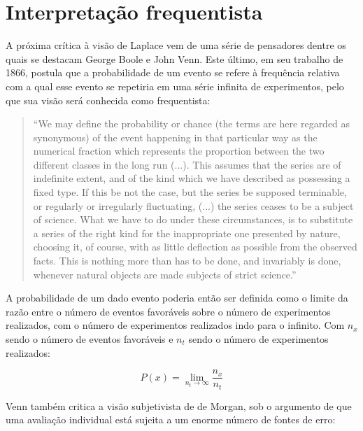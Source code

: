 \section{Interpretação frequentista}
A próxima crítica à visão de Laplace 
vem de uma série de pensadores dentre os quais se destacam George Boole e John Venn.
Este último, em seu trabalho de 
1866, postula que a probabilidade de um evento se refere à
frequência relativa com a qual esse evento se repetiria em uma
série infinita de experimentos, pelo que sua visão será conhecida como frequentista:

\begin{quote}
``We may define the probability or chance (the terms are here regarded as synonymous) of the event happening in that
particular way as the numerical fraction which represents the proportion between the two different classes in the long run (...).
This assumes that the series are of indefinite extent, and of the kind which we have described as possessing a fixed type.
If this be not the case, but the series be supposed terminable, or regularly or irregularly fluctuating, (...) the series ceases
to be a subject of science. What we have to do under these circumstances, is to substitute a series of the right kind for
the inappropriate one presented by nature, choosing it, of course, with as little deflection as possible from the observed facts.
This is nothing more than has to be done, and invariably is done, whenever natural objects are made subjects of strict science.''
\citep{Venn1866}
\end{quote}

A probabilidade de um dado evento poderia então ser definida como o limite da razão entre o número de eventos
favoráveis sobre o número de experimentos realizados, com o número de experimentos realizados indo para o infinito. Com 
$n_x$ sendo o número de eventos favoráveis e $n_t$ sendo o número de experimentos realizados:

\begin{equation}
	P(x) = \lim_{n_t \rightarrow \infty} \frac{n_x}{n_t} 
\end{equation}

Venn também critica a visão subjetivista de de Morgan, sob
o argumento de que uma avaliação individual está sujeita a
um enorme número de fontes de erro:


